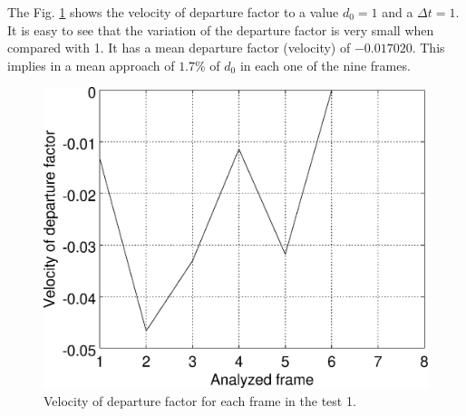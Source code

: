 The Fig. \ref{fig:res_graph1v} shows the velocity of departure factor
to a value $d_0=1$ and a $\Delta t=1$. It is easy to see that the variation
of the departure factor is very small when compared with 1. 
It has a mean departure factor (velocity) of $-0.017020$. This implies in a mean approach of $1.7\%$ of $d_0$
in each one of the nine frames.
\begin{figure}[!hbt]
\centering
\includegraphics[width=0.8\columnwidth]{images/graph1v.eps}
\caption{Velocity of departure factor for each frame in the test 1.}
\label{fig:res_graph1v}
\end{figure}


